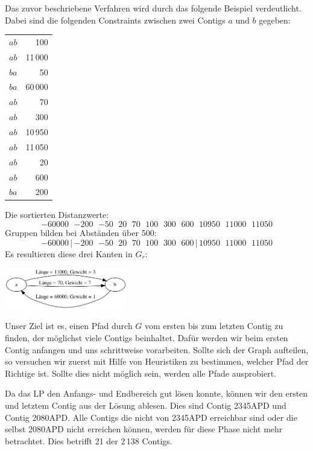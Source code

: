 Das zuvor beschriebene Verfahren wird durch das folgende Beispiel verdeutlicht. Dabei sind die folgenden Constraints zwischen zwei Contigs $a$ und $b$ gegeben:
\begin{center}
	\begin{tabular}{lr}
		$a$\quad $b$\quad &100\\
		$a$\quad $b$\quad &11\,000\\
		$b$\quad $a$\quad &50\\
		$b$\quad $a$\quad &60\,000\\
		$a$\quad $b$\quad &70\\
		$a$\quad $b$\quad &300\\
		$a$\quad $b$\quad &10\,950\\
		$a$\quad $b$\quad &11\,050\\
		$a$\quad $b$\quad &20\\
		$a$\quad $b$\quad &600\\
		$b$\quad $a$\quad &200
	\end{tabular}
\end{center}
Die sortierten Distanzwerte:
\[-60000\ \ \,{-200}\ \ \,{-50}\ \ \,20\ \ \,70\ \ \,100\ \ \,300\ \ \,600\ \ \,10950\ \ \,11000\ \ \,11050\]
Gruppen bilden bei Abständen über 500:
\[-60000\,|\, {-200}\ \ \,{-50}\ \ \,20\ \ \,70\ \ \,100\ \ \,300\ \ \,600\, |\, 10950\ \ \,11000\ \ \,11050\]
Es resultieren diese drei Kanten in $G_r$:

\begin{center}
	\includegraphics[width=0.4\textwidth]{bilder/dreikannten}
\end{center}


Unser Ziel ist es, einen Pfad durch $G$ vom ersten bis zum letzten Contig zu finden, der möglichst viele Contigs beinhaltet.
Dafür werden wir beim ersten Contig anfangen und uns schrittweise vorarbeiten. Sollte sich der Graph aufteilen, so versuchen wir zuerst mit Hilfe von Heuristiken zu bestimmen, welcher Pfad der Richtige ist. Sollte dies nicht möglich sein, werden alle Pfade ausprobiert.

Da das LP den Anfangs- und Endbereich gut lösen konnte, können wir den ersten und letztem Contig aus der Lösung ablesen. Dies sind Contig 2345APD und Contig 2080APD. Alle Contigs die nicht von 2345APD erreichbar sind oder die selbst 2080APD nicht erreichen können, werden für diese Phase nicht mehr betrachtet. Dies betrifft 21 der 2\,138 Contigs.


